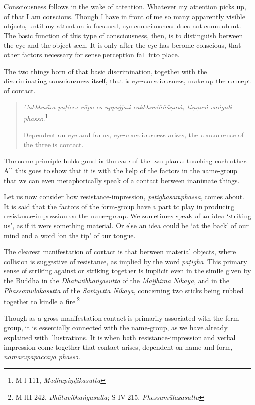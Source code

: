 Consciousness follows in the wake of attention. Whatever my attention picks up, of that I am conscious. Though I have in front of me so many apparently visible objects, until my attention is focussed, eye-consciousness does not come about. The basic function of this type of consciousness, then, is to distinguish between the eye and the object seen. It is only after the eye has become conscious, that other factors necessary for sense perception fall into place.

The two things born of that basic discrimination, together with the discriminating consciousness itself, that is eye-consciousness, make up the concept of contact.

\begin{quote}
\emph{Cakkhuñca paṭicca rūpe ca uppajjati cakkhuviññāṇaṁ, tiṇṇaṁ saṅgati phasso}.\footnote{M I 111, \emph{Madhupiṇḍikasutta}}

Dependent on eye and forms, eye-consciousness arises, the concurrence of the three is contact.
\end{quote}

The same principle holds good in the case of the two planks touching each other. All this goes to show that it is with the help of the factors in the name-group that we can even metaphorically speak of a contact between inanimate things.

Let us now consider how resistance-impression, \emph{paṭighasamphassa}, comes about. It is said that the factors of the form-group have a part to play in producing resistance-impression on the name-group. We sometimes speak of an idea `striking us', as if it were something material. Or else an idea could be `at the back' of our mind and a word `on the tip' of our tongue.

The clearest manifestation of contact is that between material objects, where collision is suggestive of resistance, as implied by the word \emph{paṭigha}. This primary sense of striking against or striking together is implicit even in the simile given by the Buddha in the \emph{Dhātuvibhaṅgasutta} of the \emph{Majjhima Nikāya}, and in the \emph{Phassamūlakasutta} of the \emph{Saṁyutta Nikāya}, concerning two sticks being rubbed together to kindle a fire.\footnote{M III 242, \emph{Dhātuvibhaṅgasutta}; S IV 215, \emph{Phassamūlakasutta}}

Though as a gross manifestation contact is primarily associated with the form-group, it is essentially connected with the name-group, as we have already explained with illustrations. It is when both resistance-impression and verbal impression come together that contact arises, dependent on name-and-form, \emph{nāmarūpapaccayā phasso}.

